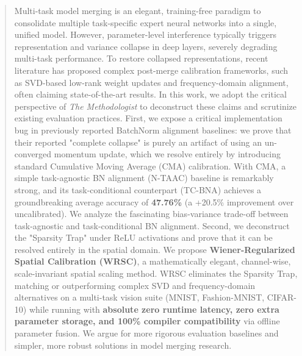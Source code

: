 \documentclass{article}
\theoremstyle{plain}
\theoremstyle{definition}
\theoremstyle{remark}
\begin{document}

\printAffiliationsAndNotice{}

\begin{abstract}
Multi-task model merging is an elegant, training-free paradigm to consolidate multiple task-specific expert neural networks into a single, unified model. However, parameter-level interference typically triggers representation and variance collapse in deep layers, severely degrading multi-task performance. To restore collapsed representations, recent literature has proposed complex post-merge calibration frameworks, such as SVD-based low-rank weight updates and frequency-domain alignment, often claiming state-of-the-art results. In this work, we adopt the critical perspective of \textit{The Methodologist} to deconstruct these claims and scrutinize existing evaluation practices. First, we expose a critical implementation bug in previously reported BatchNorm alignment baselines: we prove that their reported "complete collapse" is purely an artifact of using an un-converged momentum update, which we resolve entirely by introducing standard Cumulative Moving Average (CMA) calibration. With CMA, a simple task-agnostic BN alignment (N-TAAC) baseline is remarkably strong, and its task-conditional counterpart (TC-BNA) achieves a groundbreaking average accuracy of \textbf{47.76\%} (a +20.5\% improvement over uncalibrated). We analyze the fascinating bias-variance trade-off between task-agnostic and task-conditional BN alignment. Second, we deconstruct the "Sparsity Trap" under ReLU activations and prove that it can be resolved entirely in the spatial domain. We propose \textbf{Wiener-Regularized Spatial Calibration (WRSC)}, a mathematically elegant, channel-wise, scale-invariant spatial scaling method. WRSC eliminates the Sparsity Trap, matching or outperforming complex SVD and frequency-domain alternatives on a multi-task vision suite (MNIST, Fashion-MNIST, CIFAR-10) while running with \textbf{absolute zero runtime latency, zero extra parameter storage, and 100\% compiler compatibility} via offline parameter fusion. We argue for more rigorous evaluation baselines and simpler, more robust solutions in model merging research.
\end{abstract}
\end{document}

